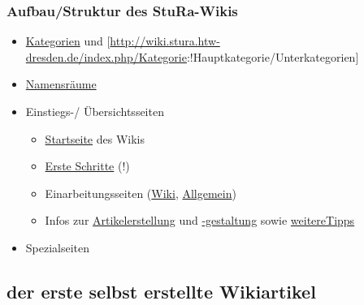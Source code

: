 \documentclass{beamer}
\begin{document}
\begin{frame}
  \frametitle{Aufbau/Struktur des StuRa-Wikis}
  
  \begin{itemize}[<+->]
  \item
    \href{http://wiki.stura.htw-dresden.de/index.php/Spezial:Kategorien}{Kategorien}
    und
    [\url{http://wiki.stura.htw-dresden.de/index.php/Kategorie}:!Hauptkategorie/Unterkategorien]
  \item \href{http://wiki.stura.htw-dresden.de/index.php/Admin:Namensr\%C3\%A4ume}{Namensräume}
  \item Einstiegs-/ Übersichtsseiten
    \begin{itemize}
    \item \href{http://wiki.stura.htw-dresden.de/index.php/Hauptseite}{Startseite} des Wikis
    \item \href{http://wiki.stura.htw-dresden.de/index.php/StuRa_HTW_Dresden:Erste_Schritte}{Erste Schritte} (!)
    \item Einarbeitungsseiten
      (\href{http://wiki.stura.htw-dresden.de/index.php/Wiki/Einarbeitung}{Wiki},
      \href{http://wiki.stura.htw-dresden.de/index.php/Einarbeitung}{Allgemein})
    \item Infos zur
      \href{http://wiki.stura.htw-dresden.de/index.php/Artikelerstellung}{Artikelerstellung}
      und
      \href{http://wiki.stura.htw-dresden.de/index.php/Admin:Artikelgestaltung}{-gestaltung}
      sowie
      \href{https://de.wikipedia.org/wiki/Wikipedia:Wie_schreibe_ich_gute_Artikel}{weitereTipps}
    \end{itemize}
  \item Spezialseiten
  \end{itemize}
\end{frame}

\subsection{der erste selbst erstellte Wikiartikel}
\end{document}

